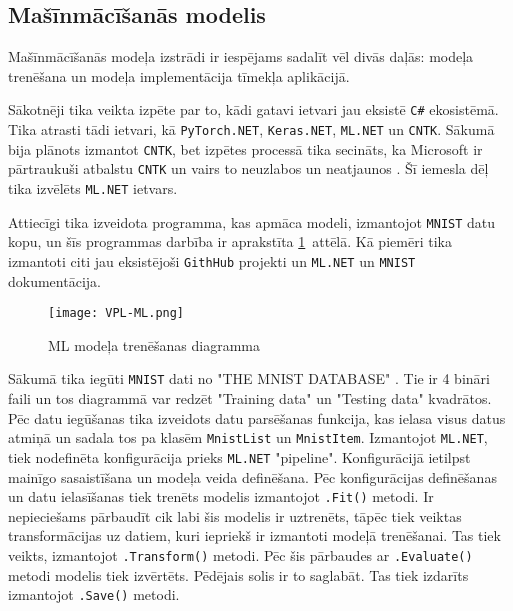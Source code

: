 \subsection{Mašīnmācīšanās modelis}

    Mašīnmācīšanās modeļa izstrādi ir iespējams sadalīt vēl divās daļās: modeļa trenēšana un modeļa
    implementācija tīmekļa aplikācijā.

    Sākotnēji tika veikta izpēte par to, kādi gatavi
    ietvari jau eksistē \texttt{C\#} ekosistēmā. Tika atrasti tādi ietvari, kā \texttt{PyTorch.NET},
    \texttt{Keras.NET}, \texttt{ML.NET} un \texttt{CNTK}. Sākumā bija plānots izmantot \texttt{CNTK},
    bet izpētes processā tika secināts, ka Microsoft ir pārtraukuši atbalstu \texttt{CNTK} un vairs
    to neuzlabos un neatjaunos \cite{chrisbasogluCNTKReleaseNotes}. Šī iemesla dēļ tika izvēlēts \texttt{ML.NET} ietvars.

    Attiecīgi tika izveidota programma, kas apmāca modeli, izmantojot \texttt{MNIST} datu kopu, un
    šīs programmas darbība ir aprakstīta \ref{ml:train}~attēlā. Kā piemēri tika izmantoti citi jau
    eksistējoši \texttt{GithHub} projekti un \texttt{ML.NET} un \texttt{MNIST} dokumentācija.
    \cite{DotnetMachinelearningsamples2021} \cite{kexugitTestRunWorking} \cite{MLNETTutorial}
    \cite{natkeMLNETDocumentation} \cite{paxbunPaxbunCntkMnistPractice2019}

    \begin{figure}[H]
        \centering
        \texttt{[image: VPL-ML.png]}
        \caption{ML modeļa trenēšanas diagramma}
        \label{ml:train}
    \end{figure}

    Sākumā tika iegūti \texttt{MNIST} dati no "THE MNIST DATABASE" \cite{MNISTHandwrittenDigit}. Tie ir
    4 bināri faili un tos diagrammā var redzēt "Training data" un "Testing data" kvadrātos. Pēc datu iegūšanas
    tika izveidots datu parsēšanas funkcija, kas ielasa visus datus atmiņā un sadala tos pa klasēm \texttt{MnistList} un \texttt{MnistItem}. Izmantojot \texttt{ML.NET}, tiek nodefinēta
    konfigurācija prieks \texttt{ML.NET} "pipeline". Konfigurācijā ietilpst mainīgo sasaistīšana un
    modeļa veida definēšana. Pēc konfigurācijas definēšanas un datu ielasīšanas tiek trenēts modelis
    izmantojot \texttt{.Fit()} metodi. Ir nepieciešams pārbaudīt cik labi šis
    modelis ir uztrenēts, tāpēc tiek veiktas transformācijas uz datiem, kuri iepriekš ir izmantoti modeļā trenēšanai. Tas tiek veikts, izmantojot \texttt{.Transform()} metodi. Pēc šis pārbaudes ar \texttt{.Evaluate()} metodi modelis tiek izvērtēts. Pēdējais solis ir to saglabāt. Tas tiek izdarīts
    izmantojot \texttt{.Save()} metodi.

